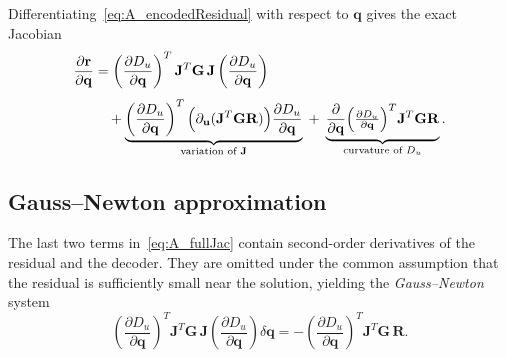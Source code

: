 Differentiating~\eqref{eq:A_encodedResidual} with respect to \(\mathbf q\)
gives the exact Jacobian
%
\begin{align}
\frac{\partial\mathbf r}{\partial\mathbf q}
&=
\left(
 \frac{\partial D_u}{\partial\mathbf q}
\right)^{T}
\mathbf J^{T}
\mathbf G\,
\mathbf J
\left(
 \frac{\partial D_u}{\partial\mathbf q}
\right)
\notag\\[4pt]
&\quad
+
\underbrace{
\left(
 \frac{\partial D_u}{\partial\mathbf q}
\right)^{T}
\Bigl(
      \partial_{\mathbf u}(\mathbf J^{T}\mathbf G\mathbf R)
 \Bigr)
 \frac{\partial D_u}{\partial\mathbf q}
}_{\text{variation of }\mathbf J}
\;+\;
\underbrace{
\frac{\partial}{\partial\mathbf q}
\Bigl(
 \tfrac{\partial D_u}{\partial\mathbf q}
\Bigr)^{T}
\mathbf J^{T}\mathbf G\mathbf R
}_{\text{curvature of }D_u}.
\label{eq:A_fullJac}
\end{align}

\subsection{Gauss–Newton approximation}
The last two terms in~\eqref{eq:A_fullJac} contain second-order derivatives of
the residual and the decoder.  They are omitted under the common
assumption that the residual is sufficiently small near the solution, yielding
the \emph{Gauss–Newton} system
%
\begin{equation}
\left(
 \frac{\partial D_u}{\partial\mathbf q}
\right)^{T}
\mathbf J^{T}
\mathbf G\,
\mathbf J
\left(
 \frac{\partial D_u}{\partial\mathbf q}
\right)
\delta\mathbf q
=
-
\left(
 \frac{\partial D_u}{\partial\mathbf q}
\right)^{T}
\mathbf J^{T}
\mathbf G\,\mathbf R.
\label{eq:A_GNsystem}
\end{equation}